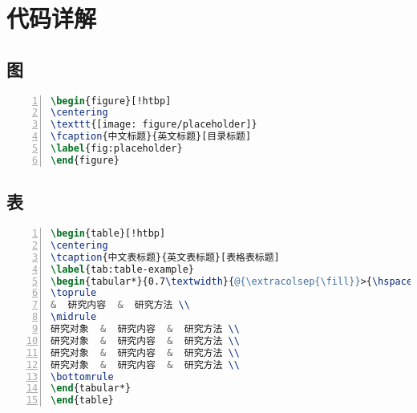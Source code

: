 
\chapter{ 代码详解}

\section{图}
\begin{lstlisting}[language=tex, label=lst:helloworld, caption=图-题注代码, numbers=left, basicstyle=\ttfamily]
\begin{figure}[!htbp]
\centering
\texttt{[image: figure/placeholder]}
\fcaption{中文标题}{英文标题}[目录标题]
\label{fig:placeholder}
\end{figure}

\end{lstlisting}

\section{表}

\begin{lstlisting}[language=tex, label=lst:helloworld, caption=表-题注代码, numbers=left, basicstyle=\ttfamily]
\begin{table}[!htbp]
\centering
\tcaption{中文表标题}{英文表标题}[表格表标题]
\label{tab:table-example}
\begin{tabular*}{0.7\textwidth}{@{\extracolsep{\fill}}>{\hspace{0.5cm}}ccc}
\toprule
&  研究内容  &  研究方法 \\
\midrule
研究对象  &  研究内容  &  研究方法 \\
研究对象  &  研究内容  &  研究方法 \\
研究对象  &  研究内容  &  研究方法 \\
研究对象  &  研究内容  &  研究方法 \\
\bottomrule
\end{tabular*} 
\end{table}
\end{lstlisting}


